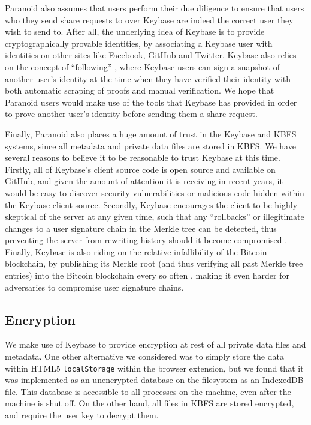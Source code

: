 \documentclass[letterpaper,twocolumn,10pt]{article}
\begin{document}
Paranoid also assumes that users perform their due diligence to ensure that users who they send share requests to over Keybase are indeed the correct user they wish to send to. After all, the underlying idea of Keybase is to provide cryptographically provable identities, by associating a Keybase user with identities on other sites like Facebook, GitHub and Twitter. Keybase also relies on the concept of ``following'' \cite{KeybaseFollowing}, where Keybase users can sign a snapshot of another user's identity at the time when they have verified their identity with both automatic scraping of proofs and manual verification. We hope that Paranoid users would make use of the tools that Keybase has provided in order to prove another user's identity before sending them a share request.

Finally, Paranoid also places a huge amount of trust in the Keybase and KBFS systems, since all metadata and private data files are stored in KBFS. We have several reasons to believe it to be reasonable to trust Keybase at this time. Firstly, all of Keybase's client source code is open source and available on GitHub, and given the amount of attention it is receiving in recent years, it would be easy to discover security vulnerabilities or malicious code hidden within the Keybase client source. Secondly, Keybase encourages the client to be highly skeptical of the server at any given time, such that any ``rollbacks'' or illegitimate changes to a user signature chain in the Merkle tree can be detected, thus preventing the server from rewriting history should it become compromised \cite{KeybaseServerSecurity}. Finally, Keybase is also riding on the relative infallibility of the Bitcoin blockchain, by publishing its Merkle root (and thus verifying all past Merkle tree entries) into the Bitcoin blockchain every so often \cite{KeybaseBitcoin}, making it even harder for adversaries to compromise user signature chains.

\subsection{Encryption}

We make use of Keybase to provide encryption at rest of all private data files and metadata. One other alternative we considered was to simply store the data within HTML5 \texttt{localStorage} within the browser extension, but we found that it was implemented as an unencrypted database on the filesystem as an IndexedDB file. This database is accessible to all processes on the machine, even after the machine is shut off. On the other hand, all files in KBFS are stored encrypted, and require the user key to decrypt them.
\end{document}

